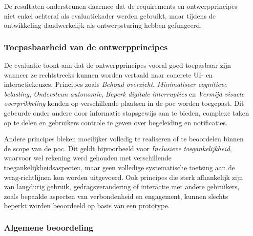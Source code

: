 \vspace{1em}

De resultaten ondersteunen daarmee dat de requirements en ontwerpprincipes niet enkel achteraf als evaluatiekader werden gebruikt, maar tijdens de ontwikkeling daadwerkelijk als ontwerpsturing hebben gefungeerd.

\vspace{1em}

\subsubsection{Toepasbaarheid van de ontwerpprincipes}
\label{subsec:toepasbaarheid-ontwerpprincipes}

\vspace{1em}

De evaluatie toont aan dat de ontwerpprincipes vooral goed toepasbaar zijn wanneer ze rechtstreeks kunnen worden vertaald naar concrete UI- en interactiekeuzes. Principes zoals \textit{Behoud overzicht}, \textit{Minimaliseer cognitieve belasting}, \textit{Ondersteun autonomie}, \textit{Beperk digitale interrupties} en \textit{Vermijd visuele overprikkeling} konden op verschillende plaatsen in de \acrshort{poc} worden toegepast. Dit gebeurde onder andere door informatie stapsgewijs aan te bieden, complexe taken op te delen en gebruikers controle te geven over begeleiding en notificaties.

\vspace{1em}

Andere principes bleken moeilijker volledig te realiseren of te beoordelen binnen de scope van de \acrshort{poc}. Dit geldt bijvoorbeeld voor \textit{Inclusieve toegankelijkheid}, waarvoor wel rekening werd gehouden met verschillende toegankelijkheidsaspecten, maar geen volledige systematische toetsing aan de \acrshort{wcag}-richtlijnen kon worden uitgevoerd. Ook principes die sterk afhankelijk zijn van langdurig gebruik, gedragsverandering of interactie met andere gebruikers, zoals bepaalde aspecten van verbondenheid en engagement, kunnen slechts beperkt worden beoordeeld op basis van een prototype.

\vspace{1em}

\subsubsection{Algemene beoordeling}
\label{subsec}

\vspace{1em}

